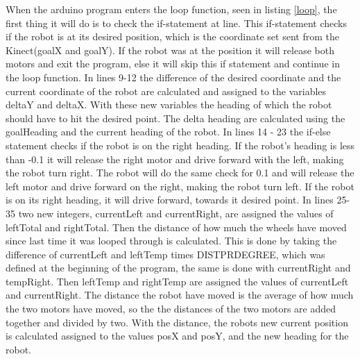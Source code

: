 When the arduino program enters the loop function, seen in listing \ref{loop}, the first thing it will do is to check the if-statement at line. This if-statement checks if the robot is at its desired position, which is the coordinate set sent from the Kinect(goalX and goalY). If the robot was at the position it will release both motors and exit the program, else it will skip this if statement and continue in the loop function. \newline
In lines 9-12 the difference of the desired coordinate and the current coordinate of the robot are calculated and assigned to the variables deltaY and deltaX. With these new variables the heading of which the robot should have to hit the desired point. The delta heading are calculated using the goalHeading and the current heading of the robot.\newline
In lines 14 - 23 the if-else statement checks if the robot is on the right heading. If the robot's heading is less than -0.1 it will release the right motor and drive forward with the left, making the robot turn right. The robot will do the same check for 0.1 and will release the left motor and drive forward on the right, making the robot turn left. If the robot is on its right heading, it will drive forward, towards it desired point. \newline
In lines 25-35 two new integers, currentLeft and currentRight, are assigned the values of leftTotal and rightTotal. Then the distance of how much the wheels have moved since last time it was looped through is calculated. This is done by taking the difference of currentLeft and leftTemp times DISTPRDEGREE, which was defined at the beginning of the program, the same is done with currentRight and tempRight. Then leftTemp and rightTemp are assigned the values of currentLeft and currentRight. \newline
The distance the robot have moved is the average of how much the two motors have moved, so the the distances of the two motors are added together and divided by two. With the distance, the robots new current position is calculated assigned to the values posX and posY, and the new heading for the robot.


